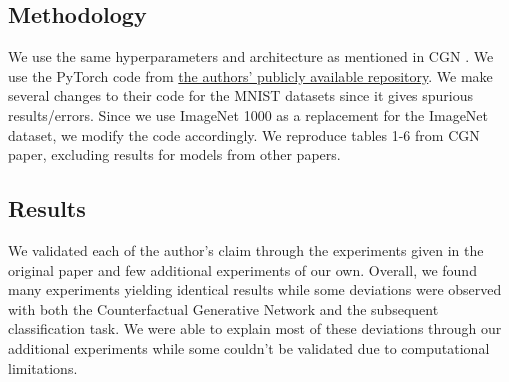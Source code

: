     


\subsection*{Methodology}
We use the same hyperparameters and architecture as mentioned in CGN \cite{sauer2021counterfactual}. We use the PyTorch code from \href{www.github.com/autonomousvision/counterfactual_generative_networks}{the authors' publicly available repository}. We make several changes to their code for the MNIST datasets since it gives spurious results/errors. Since we use ImageNet 1000 as a replacement for the ImageNet dataset, we modify the code accordingly. We reproduce tables 1-6 from CGN \cite{sauer2021counterfactual} paper, excluding results for models from other papers.

\subsection*{Results}
We validated each of the author's claim through the experiments given in the original paper and few additional experiments of our own. Overall, we found many experiments yielding identical results while some deviations were observed with both the Counterfactual Generative Network and the subsequent classification task. We were able to explain most of these deviations through our additional experiments while some couldn't be validated due to computational limitations.


